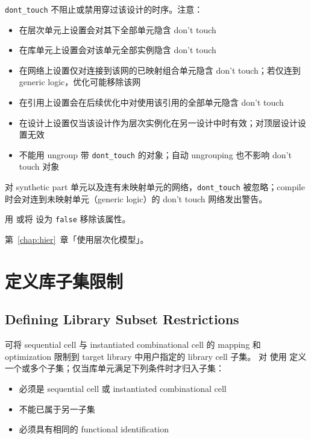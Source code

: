 \texttt{dont\_touch} 不阻止或禁用穿过该设计的时序。注意：
\begin{itemize}
  \item 在层次单元上设置会对其下全部单元隐含 don't touch
  \item 在库单元上设置会对该单元全部实例隐含 don't touch
  \item 在网络上设置仅对连接到该网的已映射组合单元隐含 don't touch；若仅连到 generic logic，优化可能移除该网
  \item 在引用上设置会在后续优化中对使用该引用的全部单元隐含 don't touch
  \item 在设计上设置仅当该设计作为层次实例化在另一设计中时有效；对顶层设计设置无效
  \item 不能用  ungroup 带 \texttt{dont\_touch} 的对象；自动 ungrouping 也不影响 don't touch 对象
\end{itemize}

\begin{noteBox}
对 synthetic part 单元以及连有未映射单元的网络，\texttt{dont\_touch} 被忽略；compile 时会对连到未映射单元（generic logic）的 don't touch 网络发出警告。
\end{noteBox}

用  或将  设为 \texttt{false} 移除该属性。

\begin{seeAlsoBox}
第~\ref{chap:hier}~章「使用层次化模型」。
\end{seeAlsoBox}

\section{定义库子集限制}
\subsection*{Defining Library Subset Restrictions}

可将 sequential cell 与 instantiated combinational cell 的 mapping 和 optimization 限制到 target library 中用户指定的 library cell 子集。
对  使用  定义一个或多个子集；仅当库单元满足下列条件时才归入子集：
\begin{itemize}
  \item 必须是 sequential cell 或 instantiated combinational cell
  \item 不能已属于另一子集
  \item 必须具有相同的 functional identification
\end{itemize}

